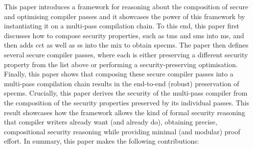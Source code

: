 \documentclass[dvipsnames,conference]{IEEEtran}
\theoremstyle{definition}
\begin{document}
This paper introduces a framework for reasoning about the composition of secure and optimising compiler passes %
and it showcases the power of this framework by instantiating it on a multi-pass compilation chain.
To this end, this paper first discusses how to compose security properties, such as \gls*{tms} and \gls*{sms} into \gls*{ms}, and then adds \gls*{cct} as well as \gls*{ss} into the mix to obtain \gls*{specms}.
The paper then defines several secure compiler passes, where each is either preserving a different security property from the list above
or performing a security-preserving optimisation.
Finally, this paper shows that composing these secure compiler passes into a multi-pass compilation chain results in the end-to-end (robust) preservation of \gls*{specms}.
Crucially, this paper derives the security of the multi-pass compiler from the composition of the security properties preserved by its individual passes.
This result showcases how the framework allows the kind of formal security reasoning that compiler writers already want (and already do), obtaining precise, compositional security reasoning while providing minimal (and modular) proof effort.
%
In summary, this paper makes the following contributions:
\end{document}
